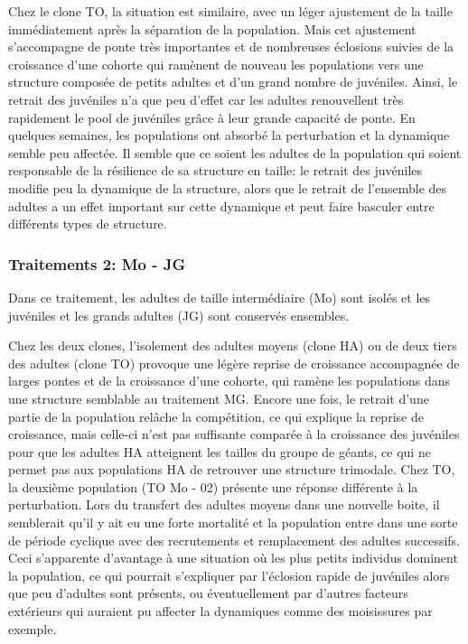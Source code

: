 Chez le clone TO, la situation est similaire, avec un léger ajustement de la
taille immédiatement après la séparation de la population. Mais cet ajustement
s'accompagne de ponte très importantes et de nombreuses éclosions suivies de
la croissance d'une cohorte qui ramènent de nouveau les populations vers une
structure composée de petits adultes et d'un grand nombre de juvéniles.
Ainsi, le retrait des juvéniles n'a que peu d'effet car les adultes renouvellent très rapidement le
pool de juvéniles grâce à leur grande capacité de ponte. En quelques semaines,
les populations ont absorbé la perturbation et la dynamique semble peu affectée.
Il semble que ce soient les adultes de la population qui soient
responsable de la résilience de sa structure en taille: le retrait des juvéniles
modifie peu la dynamique de la structure, alors que le retrait de l'ensemble des
adultes a un effet important sur cette dynamique et peut faire basculer entre
différents types de structure. 

\subsubsection{Traitements 2: Mo - JG}

Dans ce traitement, les adultes de taille intermédiaire (Mo) sont isolés et les
juvéniles et les grands adultes (JG) sont conservés ensembles.

Chez les deux clones, l'isolement des adultes moyens (clone HA) ou de deux tiers
des adultes (clone TO) provoque une légère reprise de croissance accompagnée de
larges pontes et de la croissance d'une cohorte, qui ramène les populations dans
une structure semblable au traitement MG. Encore une fois, le retrait d'une
partie de la population relâche la compétition, ce qui explique la reprise de croissance,
mais celle-ci n'est pas suffisante comparée à la croissance des juvéniles pour
que les adultes HA atteignent les tailles du groupe de géants, ce qui ne permet
pas aux populations HA de retrouver une structure trimodale. Chez TO, la
deuxième population (TO Mo - 02) présente une réponse différente à la
perturbation. Lors du transfert des adultes moyens dans une nouvelle boite, il
semblerait qu'il y ait eu une forte mortalité et la population entre dans une
sorte de période cyclique avec des recrutements et remplacement des adultes
successifs. Ceci s'apparente d'avantage à une situation où les plus petits
individus dominent la population, ce qui pourrait s'expliquer par l'éclosion
rapide de juvéniles alors que peu d'adultes sont présents, ou éventuellement par
d'autres facteurs extérieurs qui auraient pu affecter la dynamiques comme des
moisissures par exemple. 

